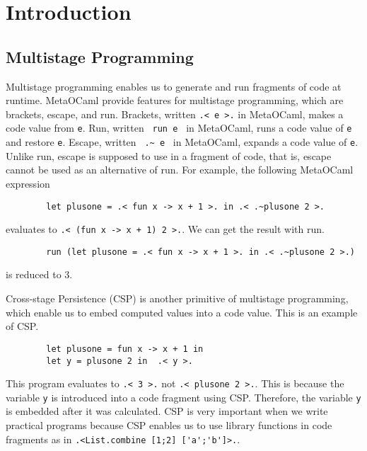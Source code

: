 \documentclass[runningheads]{llncs}
\begin{document}
\section{Introduction}

\subsection{Multistage Programming}


Multistage programming enables us to generate and run fragments of code at runtime.
MetaOCaml\cite{oleg2014} provide features for multistage programming, which are brackets, escape, and run.
Brackets, written \verb|.< e >.| in MetaOCaml, makes a code value from \verb|e|.
Run, written \verb| run e | in MetaOCaml, runs a code value of \verb|e| and restore \verb|e|.
Escape, written \verb| .~ e | in MetaOCaml, expands a code value of \verb|e|.
Unlike run, escape is supposed to use in a fragment of code, that is, escape cannot be used as an alternative of run.
For example, the following MetaOCaml expression

\begin{verbatim}
        let plusone = .< fun x -> x + 1 >. in .< .~plusone 2 >.
\end{verbatim}
evaluates to \verb|.< (fun x -> x + 1) 2 >.|. We can get the result with run.
\begin{verbatim}
        run (let plusone = .< fun x -> x + 1 >. in .< .~plusone 2 >.)
\end{verbatim}
is reduced to 3.


Cross-stage Persistence (CSP) is another primitive of multistage programming, which enable us to embed computed values into a code value.
This is an example of CSP.
\begin{verbatim}
        let plusone = fun x -> x + 1 in
        let y = plusone 2 in  .< y >.
\end{verbatim}
This program evaluates to \verb|.< 3 >.| not  \verb|.< plusone 2 >.|.
This is because the variable \verb|y| is introduced into a code fragment using CSP.
Therefore, the variable \verb|y| is embedded after it was calculated.
CSP is very important when we write practical programs 
because CSP enables us to use library functions in code fragments as in \verb|.<List.combine [1;2] ['a';'b']>.|.
\end{document}
